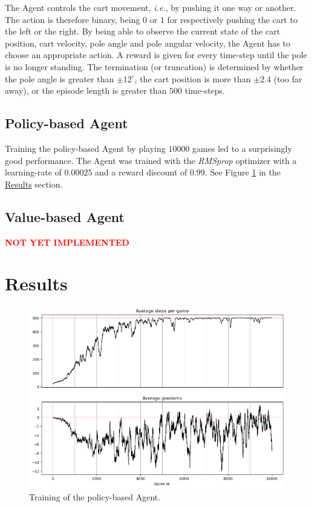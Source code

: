 \documentclass{article}
\renewenvironment{leftbar}[1][\hsize]{
    \def\FrameCommand{{\color{barcolor}\vrule width 2pt \hspace{10pt}}}
    \MakeFramed{\hsize#1 \advance\hsize-\width \FrameRestore}
}{\endMakeFramed}
\begin{document}
The Agent controls the cart movement, \textit{i.e.}, by pushing it one way or another. The action is therefore binary, being $0$ or $1$ for respectively pushing the cart to the left or the right. By being able to observe the current state of the cart position, cart velocity, pole angle and pole angular velocity, the Agent has to choose an appropriate action. A reward is given for every time-step until the pole is no longer standing. The termination (or truncation) is determined by whether the pole angle is greater than $\pm 12 ^\circ$, the cart position is more than $\pm 2.4$ (too far away), or the episode length is greater than $500$ time-steps.

\subsection*{Policy-based Agent}
\begin{leftbar}
    Training the policy-based Agent by playing $10 000$ games led to a surprisingly good performance. The Agent was trained with the \textit{RMSprop} optimizer with a learning-rate of $0.00025$ and a reward discount of $0.99$. See Figure \ref{fig:policy-based-metrics} in the \hyperlink{sec:results}{Results} section.
\end{leftbar}
\subsection*{Value-based Agent}
\begin{leftbar}
    \textbf{\textcolor{red}{NOT YET IMPLEMENTED}}
\end{leftbar}

\newpage
\hypertarget{sec:results}{}
\section*{Results}

\begin{figure}[h]
    \centering
    \includegraphics[width=15cm]{images/policy-based-metrics.png}
    \caption{Training of the policy-based Agent.}
    \label{fig:policy-based-metrics}
\end{figure}

\newpage
\printbibliography
\end{document}
